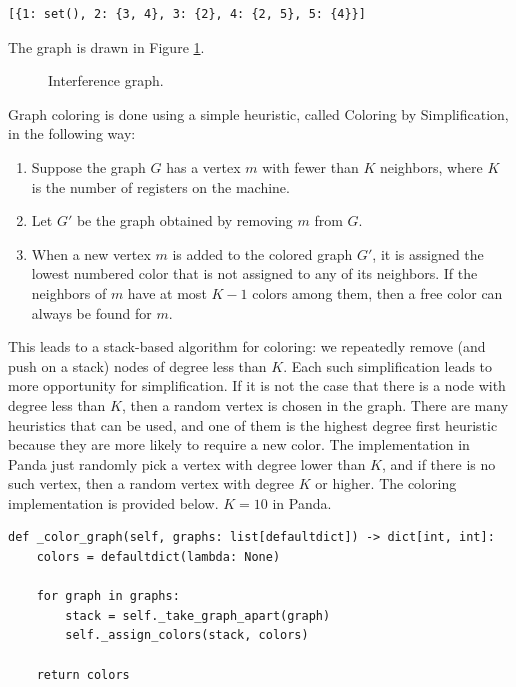 \begin{verbatim}
[{1: set(), 2: {3, 4}, 3: {2}, 4: {2, 5}, 5: {4}}]
\end{verbatim}

The graph is drawn in Figure \ref{fig:interference-graph}.

\begin{figure}[H]
    \centering
    
    \caption{Interference graph.}
    \label{fig:interference-graph}
\end{figure}

Graph coloring is done using a simple heuristic, called Coloring by Simplification, in the following way:

\begin{enumerate}
    \item Suppose the graph $G$ has a vertex $m$ with fewer than $K$ neighbors, where $K$ is the number of registers on the machine.
    \item Let $G'$ be the graph obtained by removing $m$ from $G$.
    \item When a new vertex $m$ is added to the colored graph $G'$, it is assigned the lowest numbered color that is not assigned to any of its neighbors. If the neighbors of $m$ have at most $K-1$ colors among them, then a free color can always be found for $m$.
\end{enumerate}

This leads to a stack-based algorithm for coloring: we repeatedly remove (and push on a stack) nodes of degree less than $K$. Each such simplification leads to more opportunity for simplification. If it is not the case that there is a node with degree less than $K$, then a random vertex is chosen in the graph. There are many heuristics that can be used, and one of them is the highest degree first heuristic because they are more likely to require a new color. The implementation in Panda just randomly pick a vertex with degree lower than $K$, and if there is no such vertex, then a random vertex with degree $K$ or higher. The coloring implementation is provided below. $K = 10$ in Panda.

\begin{verbatim}
def _color_graph(self, graphs: list[defaultdict]) -> dict[int, int]:
    colors = defaultdict(lambda: None)

    for graph in graphs:
        stack = self._take_graph_apart(graph)
        self._assign_colors(stack, colors)

    return colors
\end{verbatim}

